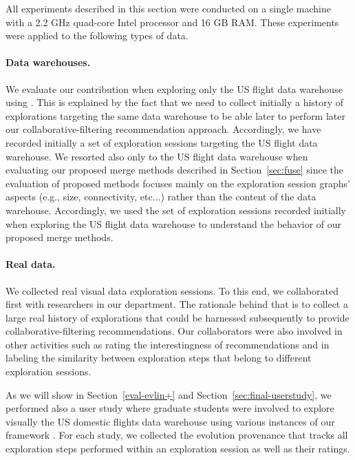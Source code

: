 All experiments described in this section were conducted on a single machine with a 2.2 GHz quad-core Intel processor and 16 GB RAM.
These experiments were applied to the following types of data.

\paragraph*{ \textbf{Data warehouses.}}
We evaluate our contribution when exploring only the US flight data warehouse using \prototype{}.
{\color{Fuchsia}
This is explained by the fact that we need to collect initially a history of explorations targeting the same data warehouse to be able later to perform later our collaborative-filtering recommendation approach. 
Accordingly, we have recorded initially a set of exploration sessions targeting the US flight data warehouse.  
We resorted also only to the US flight data warehouse when evaluating our proposed merge methods described in Section~\ref{sec:fuse} since the evaluation of proposed methods focuses mainly on the exploration session graphs' aspects (e.g., size, connectivity, etc$\ldots$) rather than the content of the data warehouse. Accordingly, we used the set of exploration sessions recorded initially when exploring the US flight data warehouse to understand the behavior of our proposed merge methods.
 }

\paragraph*{ \textbf{Real data.}}
We collected real visual data exploration sessions. To this end, we collaborated first with researchers in our department. The rationale behind that is to collect a large real history of explorations that could be harnessed subsequently to provide collaborative-filtering recommendations.
{\color{Fuchsia} Our collaborators were also involved in other activities such as rating the interestingness of recommendations and in labeling the similarity between exploration steps that belong to different exploration sessions.} 

As we will show in Section~\ref{eval-evlin+} and Section~\ref{sec:final-userstudy}, we performed also a user study where graduate students were involved to explore visually the US domestic flights data warehouse using various instances of our framework \framework{}.
For each study, we collected the evolution provenance that tracks all exploration steps performed within an exploration session as well as their ratings. 



